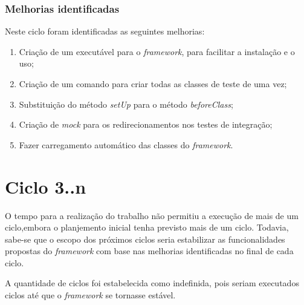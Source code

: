     \subsection{Melhorias identificadas}
    
    Neste ciclo foram identificadas as seguintes melhorias:

    \begin{enumerate}

      \item Criação de um executável para o \textit{framework}, para facilitar a instalação e o uso;
      \item Criação de um comando para criar todas as classes de teste de uma vez;
      \item Substituição do método \textit{setUp} para o método \textit{beforeClass};
      \item Criação de \textit{mock} para os redirecionamentos nos testes de integração;
      \item Fazer carregamento automático das classes do \textit{framework}.

    \end{enumerate}

\chapter{Ciclo 3..n}
  
  O tempo para a realização do trabalho não permitiu a execução de mais de um
  ciclo,embora o planjemento inicial tenha previsto mais de um ciclo. Todavia, sabe-se que o escopo dos próximos
  ciclos seria estabilizar as funcionalidades propostas do \textit{framework} com base nas melhorias identificadas
  no final de cada ciclo.
  
  A quantidade de ciclos foi estabelecida como indefinida, pois seriam executados
  ciclos até que o \textit{framework} se tornasse estável.
  